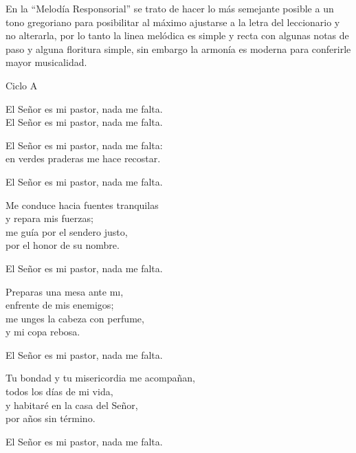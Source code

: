 \documentclass[12pt, letterpaper]{report}
\begin{document}
    \Large En la ``Melod\'ia Responsorial'' se trato de hacer lo m\'as semejante posible a un tono gregoriano
    para posibilitar al m\'aximo ajustarse a la letra del leccionario y no alterarla, por lo tanto la
    linea mel\'odica es simple y recta con algunas notas de paso y alguna floritura simple, sin embargo
    la armon\'ia es moderna para conferirle mayor musicalidad.

    \begin{center}
        \LARGE Ciclo A
    \end{center}

    \noindent
    \LARGE El Se\~nor es mi pastor, nada me falta.\\
    El Se\~nor es mi pastor, nada me falta.

    \noindent
    El Se\~nor es mi pastor, nada me falta:\\
    en verdes praderas me hace recostar.

    \noindent
    El Se\~nor es mi pastor, nada me falta.

    \noindent
    Me conduce hacia fuentes tranquilas\\
    y repara mis fuerzas;\\
    me gu\'ia por el sendero justo,\\
    por el honor de su nombre.

    \noindent
    El Se\~nor es mi pastor, nada me falta.

    \noindent
    Preparas una mesa ante m\i,\\
    enfrente de mis enemigos;\\
    me unges la cabeza con perfume,\\
    y mi copa rebosa.

    \noindent
    El Se\~nor es mi pastor, nada me falta.

    \noindent
    Tu bondad y tu misericordia me acompa\~nan,\\
    todos los d\'ias de mi vida,\\
    y habitar\'e en la casa del Se\~nor,\\
    por a\~nos sin t\'ermino.

    \noindent
    El Se\~nor es mi pastor, nada me falta.
    \clearpage


\end{document}
